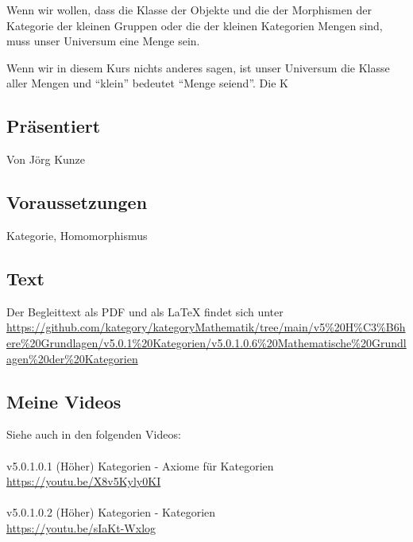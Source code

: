 \documentclass[a4paper]{amsart}
\theoremstyle{definition}
\begin{document}
Wenn wir wollen, dass die Klasse der Objekte und die der Morphismen der Kategorie der kleinen Gruppen oder die der kleinen Kategorien Mengen sind, muss unser Universum eine Menge sein.

Wenn wir in diesem Kurs nichts anderes sagen, ist unser Universum die Klasse aller Mengen und "`klein"' bedeutet "`Menge seiend"'. Die K

\subsection*{Präsentiert}
Von Jörg Kunze

\subsection*{Voraussetzungen}
Kategorie, Homomorphismus

\subsection*{Text}
Der Begleittext als PDF und als LaTeX findet sich unter
{\tiny
   \url{https://github.com/kategory/kategoryMathematik/tree/main/v5%20H%C3%B6here%20Grundlagen/v5.0.1%20Kategorien/v5.0.1.0.6%20Mathematische%20Grundlagen%20der%20Kategorien}
}

\subsection*{Meine Videos}
Siehe auch in den folgenden Videos:\\
\\
v5.0.1.0.1 (Höher) Kategorien - Axiome für Kategorien\\
\url{https://youtu.be/X8v5Kyly0KI}\\
\\
v5.0.1.0.2 (Höher) Kategorien - Kategorien\\
\url{https://youtu.be/sIaKt-Wxlog}\\
\end{document}
